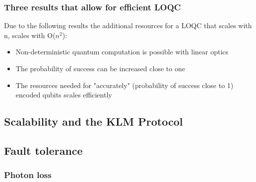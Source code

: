 \subsubsection{Three results that allow for efficient LOQC}
Due to the following results the additional resources for a LOQC that scales with n, scales with O($n^2$):
\begin{itemize}
    \item Non-deterministic quantum computation is possible with linear optics
    \item The probability of success can be increased close to one
    \item The resources needed for "accurately" (probability of success close to 1) encoded qubits scales efficiently  
\end{itemize}

\subsection{Scalability and the KLM Protocol}

\subsection{Fault tolerance}
\subsubsection{Photon loss}